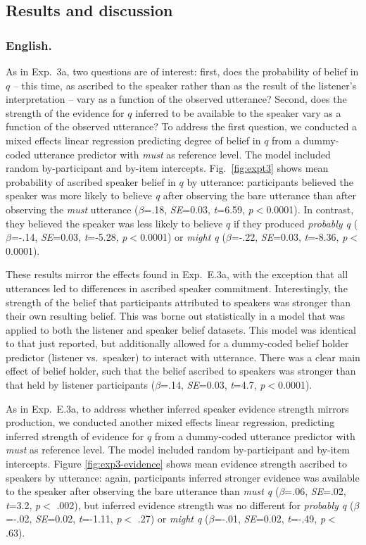 \documentclass[11pt]{article}
\newcommand{\figref}[1]{Figure \ref{#1}}
\begin{document}
\subsection{Results and discussion}

\subsubsection{English.} As in Exp.~3a, two questions are of interest: first, does the probability of  belief in $q$ -- this time, as ascribed to the speaker rather than as the result of the listener's interpretation --  vary as a function of the observed utterance? Second, does the strength of the evidence for $q$ inferred to be available to the speaker vary as a function of the observed utterance? To address the first question, we conducted a mixed effects linear regression predicting degree of belief in $q$ from a dummy-coded utterance predictor with \emph{must} as reference level. The model included random by-participant and by-item intercepts. Fig.~\ref{fig:expt3} shows mean probability of ascribed speaker belief in $q$ by utterance: participants believed the speaker was more likely to believe \emph{q}  after observing the bare utterance than after observing the \emph{must} utterance   ($\beta$=.18, \emph{SE}=0.03, \emph{t}=6.59, \emph{p}$<$0.0001). In contrast, they believed the speaker was less likely to believe $q$ if they produced \emph{probably q} ($\beta$=-.14, \emph{SE}=0.03, \emph{t}=-5.28, \emph{p}$<$0.0001) or \emph{might q} ($\beta$=-.22, \emph{SE}=0.03, \emph{t}=-8.36, \emph{p}$<$0.0001). 

These results mirror the effects found in Exp.~E.3a, with the exception that all utterances led to differences in ascribed speaker commitment. Interestingly, the strength of the belief that participants attributed to speakers was stronger than their own resulting belief. This was borne out statistically in a model that was applied to both the listener and speaker belief datasets. This model was identical to that just reported, but additionally allowed for a dummy-coded belief holder predictor (listener vs.~speaker)  to interact with utterance. There was a clear main effect of belief holder, such that the belief ascribed to speakers was stronger than that held by listener participants ($\beta$=.14, \emph{SE}=0.03, \emph{t}=4.7, \emph{p}$<$0.0001). 

As in Exp.~E.3a, to address whether inferred speaker evidence strength mirrors production, we conducted another mixed effects linear regression, predicting inferred strength of evidence for $q$ from a dummy-coded utterance predictor with \emph{must} as reference level. The model included random by-participant and by-item intercepts.  \figref{fig:exp3-evidence} shows mean evidence strength ascribed to speakers by utterance:  again, participants inferred stronger evidence was available to the speaker after observing the bare utterance than \emph{must q} ($\beta$=.06, \emph{SE}=.02, \emph{t}=3.2, \emph{p}$<$ .002), but inferred evidence strength was no different for \emph{probably q} ($\beta$=-.02, \emph{SE}=0.02, \emph{t}=-1.11, \emph{p}$<$ .27) or \emph{might q} ($\beta$=-.01, \emph{SE}=0.02, \emph{t}=-.49, \emph{p}$<$ .63).
\end{document}

